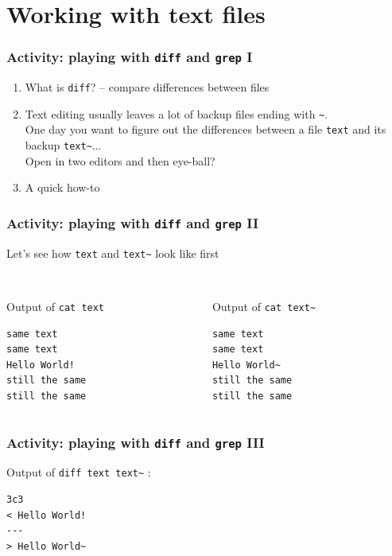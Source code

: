 \section{Working with text files} %

\begin{frame}
\frametitle{Activity: playing with \texttt{diff} and \texttt{grep} I}
\begin{enumerate}
\item What is \texttt{diff}? -- compare differences between files
\item Text editing usually leaves a lot of backup files ending with \texttt{\~}.\\  
One day you want to figure out the differences between a file \texttt{text} and its backup \texttt{text\~}...\\  
Open in two editors and then eye-ball?
\item A quick how-to
\end{enumerate}
\end{frame}


\begin{frame}[fragile]
\frametitle{Activity: playing with \texttt{diff} and \texttt{grep} II}
Let's see how \texttt{text} and \texttt{text\~} look like first

\begin{columns}
\begin{column}{0.5\textwidth}
\\ Output of \texttt{cat text}

\begin{verbatim}
same text
same text
Hello World!
still the same
still the same
\end{verbatim}
\end{column}

\begin{column}{0.5\textwidth}
\\ Output of \texttt{cat text\~}
\begin{verbatim}
same text
same text
Hello World~
still the same
still the same
\end{verbatim}
\end{column}
\end{columns}
\end{frame}


\begin{frame}[fragile]
\frametitle{Activity: playing with \texttt{diff} and \texttt{grep} III}
Output of \texttt{diff text text\~} :
\begin{verbatim}
3c3
< Hello World!
---
> Hello World~
\end{verbatim}
\end{frame}


